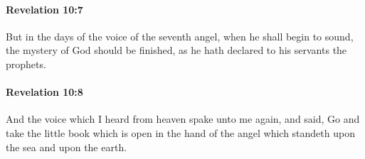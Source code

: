		\paragraph{Revelation 10:7} %
			\label{REVELATIONNT-10-7}

			But in the days of the voice of the seventh angel, when he shall begin to sound, the mystery of God should be finished, as he hath declared to his servants the prophets.

			\begin{framed}
			\scriptsize
				\begin{compactdesc}
					\item[SBLG] 
				\end{compactdesc}
			\end{framed}

		\paragraph{Revelation 10:8} %
			\label{REVELATIONNT-10-8}

			And the voice which I heard from heaven spake unto me again, and said, Go and take the little book which is open in the hand of the angel which standeth upon the sea and upon the earth.

